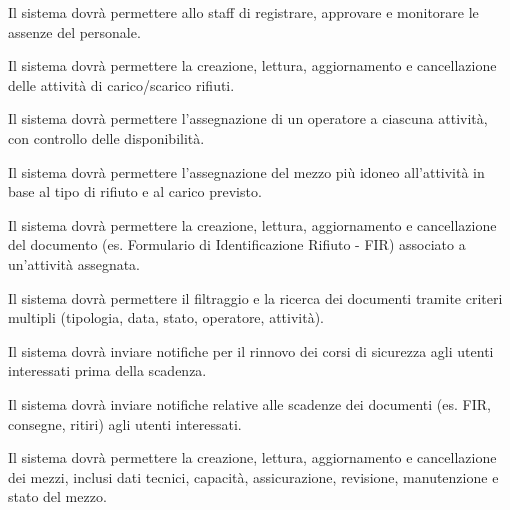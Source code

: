 \documentclass[a4paper]{report}
\begin{document}


Il sistema dovrà permettere allo staff di registrare, approvare e monitorare le assenze del personale.



Il sistema dovrà permettere la creazione, lettura, aggiornamento e cancellazione delle attività di carico/scarico rifiuti.


Il sistema dovrà permettere l'assegnazione di un operatore a ciascuna attività, con controllo delle disponibilità.


Il sistema dovrà permettere l'assegnazione del mezzo più idoneo all'attività in base al tipo di rifiuto e al carico previsto.



Il sistema dovrà permettere la creazione, lettura, aggiornamento e cancellazione del documento (es. Formulario di Identificazione Rifiuto - FIR) associato a un'attività assegnata.


Il sistema dovrà permettere il filtraggio e la ricerca dei documenti tramite criteri multipli (tipologia, data, stato, operatore, attività).


Il sistema dovrà inviare notifiche per il rinnovo dei corsi di sicurezza agli utenti interessati prima della scadenza.


Il sistema dovrà inviare notifiche relative alle scadenze dei documenti (es. FIR, consegne, ritiri) agli utenti interessati.



Il sistema dovrà permettere la creazione, lettura, aggiornamento e cancellazione dei mezzi, inclusi dati tecnici, capacità, assicurazione, revisione, manutenzione e stato del mezzo.
\end{document}
